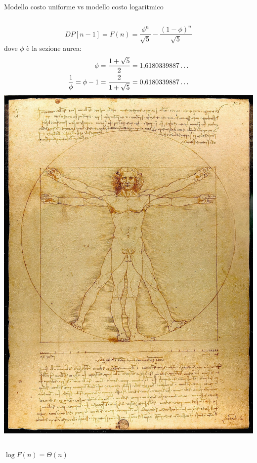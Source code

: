 \begin{frame}{Modello costo uniforme vs modello costo logaritmico}

\vspace{-9pt}
\begin{myboxtitle}
\vspace{6pt}
\begin{columns}[T]
\[
\mathit{DP}[n-1] = F(n) = \frac{\phi^n}{\sqrt{5}} - \frac{(1-\phi)^n}{\sqrt{5}} 
\]
dove $\phi$ è la \alert{sezione aurea}:
\begin{align*}
\phi &={1+\sqrt 5 \over 2}=1{,}6180339887\dots  \\
\frac{1}{\phi} = \phi - 1 & ={2 \over 1+\sqrt 5 }=0{,}6180339887\dots 
\end{align*}
\includegraphics[width=\textwidth]{vitruviano.jpg}
\end{columns}
\end{myboxtitle}


\begin{columns}[T]
\vspace{-6pt}
\pause
{}

\bigskip
\bigskip
\alert{$\log F(n) = \Theta(n)$}
\end{columns}

\end{frame}


